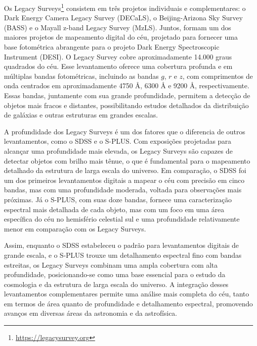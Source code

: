 Os Legacy Surveys\footnote{\url{https://legacysurvey.org}} \cite{legacy} consistem em três projetos individuais e complementares: o Dark Energy Camera Legacy Survey (DECaLS), o Beijing-Arizona Sky Survey (BASS) e o Mayall z-band Legacy Survey (MzLS). Juntos, formam um dos maiores projetos de mapeamento digital do céu, projetado para fornecer uma base fotométrica abrangente para o projeto Dark Energy Spectroscopic Instrument (DESI). O Legacy Survey cobre aproximadamente 14.000 graus quadrados do céu. Esse levantamento oferece uma cobertura profunda e em múltiplas bandas fotométricas, incluindo as bandas $g$, $r$ e $z$, com comprimentos de onda centrados em aproximadamente 4750 Å, 6300 Å e 9200 Å, respectivamente. Essas bandas, juntamente com sua grande profundidade, permitem a detecção de objetos mais fracos e distantes, possibilitando estudos detalhados da distribuição de galáxias e outras estruturas em grandes escalas.

A profundidade dos Legacy Surveys é um dos fatores que o diferencia de outros levantamentos, como o SDSS e o S-PLUS. Com exposições projetadas para alcançar uma profundidade mais elevada, os Legacy Surveys são capazes de detectar objetos com brilho mais tênue, o que é fundamental para o mapeamento detalhado da estrutura de larga escala do universo.
Em comparação, o SDSS foi um dos primeiros levantamentos digitais a mapear o céu com precisão em cinco bandas, mas com uma profundidade moderada, voltada para observações mais próximas. Já o S-PLUS, com suas doze bandas, fornece uma caracterização espectral mais detalhada de cada objeto, mas com um foco em uma área específica do céu no hemisfério celestial sul e uma profundidade relativamente menor em comparação com os Legacy Surveys.

Assim, enquanto o SDSS estabeleceu o padrão para levantamentos digitais de grande escala, e o S-PLUS trouxe um detalhamento espectral fino com bandas estreitas, os Legacy Surveys combinam uma ampla cobertura com alta profundidade, posicionando-se como uma base essencial para o estudo da cosmologia e da estrutura de larga escala do universo. A integração desses levantamentos complementares permite uma análise mais completa do céu, tanto em termos de área quanto de profundidade e detalhamento espectral, promovendo avanços em diversas áreas da astronomia e da astrofísica.





